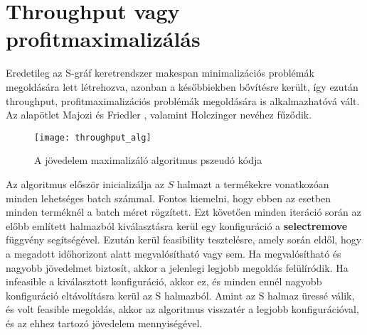 \section{Throughput vagy profitmaximalizálás}
Eredetileg az S-gráf keretrendszer makespan minimalizációs problémák megoldására lett létrehozva, azonban a későbbiekben bővítésre került, így ezután throughput, profitmaximalizációs problémák megoldására is alkalmazhatóvá vált. Az alapötlet Majozi és Friedler \cite{majozifriedler}, valamint Holczinger \cite{holczinger} nevéhez fűződik.
\begin{figure}[H]
\begin{center}
\texttt{[image: throughput\_alg]}
\caption{A jövedelem maximalizáló algoritmus pszeudó kódja \cite{Hegyhati}}
\label{throughput_alg}
\end{center}
\end{figure}
Az algoritmus először inicializálja az $S$ halmazt a termékekre vonatkozóan minden lehetséges batch számmal. Fontos kiemelni, hogy ebben az esetben minden terméknél a batch méret rögzített. Ezt követően minden iteráció során az előbb említett halmazból kiválasztásra kerül egy konfiguráció a \textbf{select\textunderscore remove} függvény segítségével. Ezután kerül feasibility tesztelésre, amely során eldől, hogy a megadott időhorizont alatt megvalósítható vagy sem. Ha megvalósítható és nagyobb jövedelmet biztosít, akkor a jelenlegi legjobb megoldás felülíródik. Ha infeasible a kiválasztott konfiguráció, akkor ez, és minden ennél nagyobb konfiguráció eltávolításra kerül az S halmazból. Amint az S halmaz üressé válik, és volt feasible megoldás, akkor az algoritmus visszatér a legjobb konfigurációval, és az ehhez tartozó jövedelem mennyiségével.

